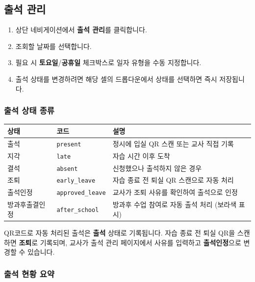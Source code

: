 \documentclass[a4paper,12pt]{article}
\newcommand{\menu}[1]{\textcolor{primary}{\textbf{#1}}}
\begin{document}
\subsection{출석 관리}

\begin{enumerate}[leftmargin=1.5em]
    \item 상단 네비게이션에서 \menu{출석 관리}를 클릭합니다.
    \item 조회할 날짜를 선택합니다.
    \item 필요 시 \textbf{토요일}/\textbf{공휴일} 체크박스로 일자 유형을 수동 지정합니다.
    \item 출석 상태를 변경하려면 해당 셀의 드롭다운에서 상태를 선택하면 즉시 저장됩니다.
\end{enumerate}

\subsubsection{출석 상태 종류}

\begin{center}
\begin{tabular}{lll}
\toprule
\textbf{상태} & \textbf{코드} & \textbf{설명} \\
\midrule
출석     & \texttt{present}        & 정시에 입실 QR 스캔 또는 교사 직접 기록 \\
지각     & \texttt{late}           & 자습 시간 이후 도착 \\
결석     & \texttt{absent}         & 신청했으나 출석하지 않은 경우 \\
조퇴     & \texttt{early\_leave}   & 자습 종료 전 퇴실 QR 스캔으로 자동 처리 \\
출석인정 & \texttt{approved\_leave} & 교사가 조퇴 사유를 확인하여 출석으로 인정 \\
방과후출결인정 & \texttt{after\_school} & 방과후 수업 참여로 자동 출석 처리 (보라색 표시) \\
\bottomrule
\end{tabular}
\end{center}

\begin{tipbox}
  QR코드로 자동 처리된 출석은 \menu{출석} 상태로 기록됩니다.
  자습 종료 전 퇴실 QR을 스캔하면 \menu{조퇴}로 기록되며,
  교사가 출석 관리 페이지에서 사유를 입력하고 \menu{출석인정}으로 변경할 수 있습니다.
\end{tipbox}

\subsubsection{출석 현황 요약}
\end{document}
